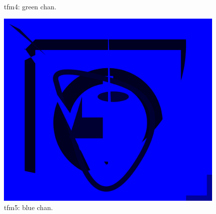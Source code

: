 \documentclass[12pt]{article}
\begin{document}
\begin{figure}[h]
\begin{minipage}[b]{0.3\textwidth}
		\caption{tfm4: green chan.}
	\end{minipage}
	\hfill
	\begin{minipage}[b]{0.3\textwidth}
		\includegraphics[width=\textwidth]{./pdf/main-test-out-5.pdf}
		\caption{tfm5: blue chan.}
	\end{minipage}
\end{figure}
\vfill
\end{document}
